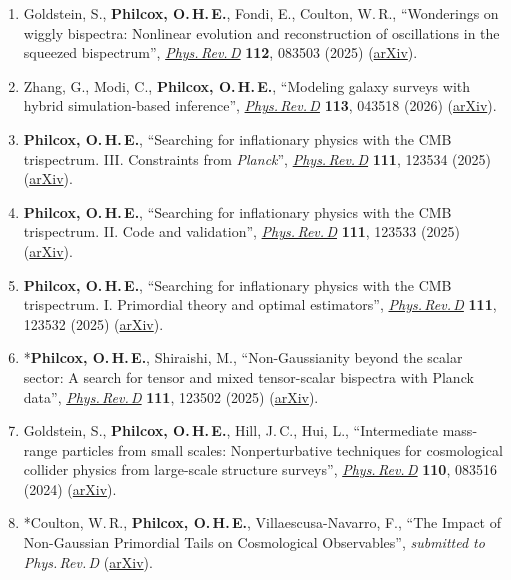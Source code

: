 \begin{enumerate}
    \item Goldstein, S., \textbf{Philcox, O.\,H.\,E.}, Fondi, E., Coulton, W.\,R., ``Wonderings on wiggly bispectra: Nonlinear evolution and reconstruction of oscillations in the squeezed bispectrum'', \href{https://doi.org/10.1103/q8m3-vspd}{\textit{Phys.\,Rev.\,D}} \textbf{112}, 083503 (2025) (\href{https://arxiv.org/abs/2505.13443}{arXiv}).
    \item Zhang, G., Modi, C., \textbf{Philcox, O.\,H.\,E.}, ``Modeling galaxy surveys with hybrid simulation-based inference'', \href{https://doi.org/10.1103/zj8s-v23z}{\textit{Phys.\,Rev.\,D}} \textbf{113}, 043518 (2026) (\href{https://arxiv.org/abs/2505.13591}{arXiv}).
    \item \textbf{Philcox, O.\,H.\,E.}, ``Searching for inflationary physics with the CMB trispectrum. III. Constraints from \textit{Planck}'', \href{https://doi.org/10.1103/y81z-g7th}{\textit{Phys.\,Rev.\,D}} \textbf{111}, 123534 (2025) (\href{https://arxiv.org/abs/2502.06931}{arXiv}).
    \item \textbf{Philcox, O.\,H.\,E.}, ``Searching for inflationary physics with the CMB trispectrum. II. Code and validation'', \href{https://doi.org/10.1103/bprw-3zj1}{\textit{Phys.\,Rev.\,D}} \textbf{111}, 123533 (2025) (\href{https://arxiv.org/abs/2502.05258}{arXiv}).
    \item \textbf{Philcox, O.\,H.\,E.}, ``Searching for inflationary physics with the CMB trispectrum. I. Primordial theory and optimal estimators'', \href{https://doi.org/10.1103/wkj2-q62t}{\textit{Phys.\,Rev.\,D}} \textbf{111}, 123532 (2025) (\href{https://arxiv.org/abs/2502.04434}{arXiv}).
    \item *\textbf{Philcox, O.\,H.\,E.}, Shiraishi, M., ``Non-Gaussianity beyond the scalar sector: A search for tensor and mixed tensor-scalar bispectra with Planck data'', \href{https://doi.org/10.1103/pb7x-lp19}{\textit{Phys.\,Rev.\,D}} \textbf{111}, 123502 (2025) (\href{https://arxiv.org/abs/2409.10595}{arXiv}).
    \item Goldstein, S., \textbf{Philcox, O.\,H.\,E.}, Hill, J.\,C., Hui, L., ``Intermediate mass-range particles from small scales: Nonperturbative techniques for cosmological collider physics from large-scale structure surveys'', \href{https://doi.org/10.1103/PhysRevD.110.083516}{\textit{Phys.\,Rev.\,D}} \textbf{110}, 083516 (2024) (\href{https://arxiv.org/abs/2407.08731}{arXiv}).
    \item *Coulton, W.\,R., \textbf{Philcox, O.\,H.\,E.}, Villaescusa-Navarro, F., ``The Impact of Non-Gaussian Primordial Tails on Cosmological Observables'', \textit{submitted to Phys.\,Rev.\,D} (\href{https://arxiv.org/abs/2406.15546}{arXiv}).

\end{enumerate}
